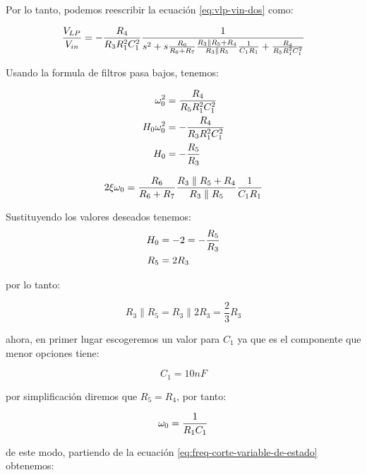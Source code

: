 Por lo tanto, podemos reescribir la ecuación \ref{eq:vlp-vin-dos} como:


\begin{equation}
    \frac{V_{LP}}{V_{in}} = - \frac{R_4}{R_3 R_1^2 C_1^2} \frac{1}{s^2 + s \frac{R_6}{R_6 + R_7} \frac{R_3 \parallel R_5 + R_4}{R_3 \parallel R_5} \frac{1}{C_1 R_1} + \frac{R_4}{R_5 R_1^2 C_1^2}}
\end{equation}

Usando la formula de filtros pasa bajos, tenemos:

\begin{align}
    \omega_0^2 &= \frac{R_4}{R_5 R_1^2 C_1^2} \label{eq:freq-corte-variable-de-estado} \\
    H_0\omega_0^2 &= - \frac{R_4}{R_3 R_1^2 C_1^2} \label{eq:howo-sqt-variable-de-estado} \\
    H_0 &= -\frac{R_5}{R_3} \label{eq:ganancia-filtro-variable-de-estado}
\end{align}

\begin{equation}
    2\xi\omega_0 = \frac{R_6}{R_6 + R_7} \frac{R_3 \parallel R_5 + R_4}{R_3 \parallel R_5} \frac{1}{C_1 R_1} 
    \label{eq:factor-amortiguamiento-variable-de-estado}
\end{equation}

Sustituyendo los valores deseados tenemos:
\begin{align*}
    H_0 &= -2 = -\frac{R_5}{R_3} \\
    R_5 &= 2 R_3 \\
\end{align*}

por lo tanto:

$$ R_3 \parallel R_5 = R_3 \parallel 2 R_3 = \frac{2}{3}R_3 $$

ahora, en primer lugar escogeremos un valor para $C_1$ ya que es el componente que menor opciones tiene:

\begin{equation*}
    \boxed{C_1 = 10 nF}
\end{equation*}

por simplificación diremos que $R_5 = R_4$, por tanto:

\begin{equation}
    \omega_0 = \frac{1}{R_1 C_1}
\end{equation}

de este modo, partiendo de la ecuación \ref{eq:freq-corte-variable-de-estado} obtenemos:

